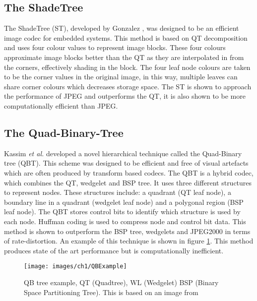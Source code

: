 
\subsection{The ShadeTree}

The ShadeTree (ST), developed by Gonzalez \cite{Gonzalez07ShadeTree}, was designed to be an efficient image codec for embedded systems. This method is based on QT decomposition and uses four colour values to represent image blocks. These four colours approximate image blocks better than the QT as they are interpolated in from the corners, effectively shading in the block. The four leaf node colours are taken to be the corner values in the original image, in this way, multiple leaves can share corner colours which decreases storage space. The ST is shown to approach the performance of JPEG and outperforms the QT, it is also shown to be more computationally efficient than JPEG.

\subsection{The Quad-Binary-Tree}

Kassim \textit{et al.} \cite{Kassim09Hierarchical} developed a novel hierarchical technique called the Quad-Binary tree (QBT). This scheme was designed to be efficient and free of visual artefacts which are often produced by transform based codecs. The QBT is a hybrid codec, which combines the QT, wedgelet and BSP tree. It uses three different structures to represent nodes. These structures include: a quadrant (QT leaf node), a boundary line in a quadrant (wedgelet leaf node) and a polygonal region (BSP leaf node). The QBT stores control bits to identify which structure is used by each node. Huffman coding is used to compress node and control bit data. This method is shown to outperform the BSP tree, wedgelets and JPEG2000 in terms of rate-distortion. An example of this technique is shown in figure \ref{QBExample}. This method produces state of the art performance but is computationally inefficient.

\begin{figure}[!h]
\centering
\texttt{[image: images/ch1/QBExample]}
\caption{QB tree example, QT (Quadtree), WL (Wedgelet) BSP (Binary Space Partitioning Tree). This is based on an image from \cite{Kassim09Hierarchical}}
\label{QBExample}
\end{figure}

